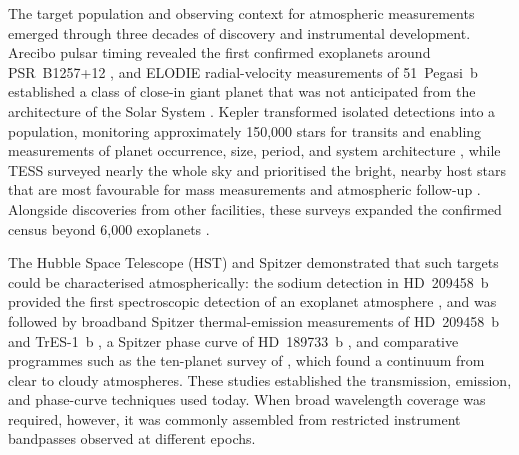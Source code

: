 The target population and observing context for atmospheric measurements
emerged through three decades of discovery and instrumental development.
Arecibo pulsar timing revealed the first confirmed exoplanets around
PSR~B1257+12 \citep{WolszczanFrail1992}, and ELODIE radial-velocity
measurements of 51~Pegasi~b established a class of close-in giant planet that
was not anticipated from the architecture of the Solar System
\citep{MayorQueloz1995}. Kepler transformed
isolated detections into a population, monitoring approximately 150,000 stars
for transits and enabling measurements of planet occurrence, size, period, and
system architecture \citep{BoruckiEtAl2010,WinnFabrycky2015}, while TESS
surveyed nearly the whole sky and prioritised the bright, nearby host stars
that are most favourable for mass measurements and atmospheric follow-up
\citep{RickerEtAl2015}. Alongside discoveries from other facilities, these
surveys expanded the confirmed census beyond 6,000 exoplanets
\citep{NASAExoplanetArchive2026}.


The Hubble Space Telescope (HST) and Spitzer demonstrated that such targets
could be characterised atmospherically: the sodium detection in HD~209458~b
provided the first spectroscopic detection of an exoplanet atmosphere
\citep{CharbonneauEtAl2002}, and was followed by broadband Spitzer
thermal-emission measurements of HD~209458~b and TrES-1~b
\citep{DemingEtAl2005,CharbonneauEtAl2005}, a Spitzer phase curve of
HD~189733~b \citep{KnutsonEtAl2007}, and comparative programmes such as the
ten-planet survey of \citet{SingEtAl2016}, which found a continuum from clear
to cloudy atmospheres. These studies established the transmission, emission,
and phase-curve techniques used today. When broad wavelength coverage was
required, however, it was commonly assembled from restricted instrument
bandpasses observed at different epochs.


